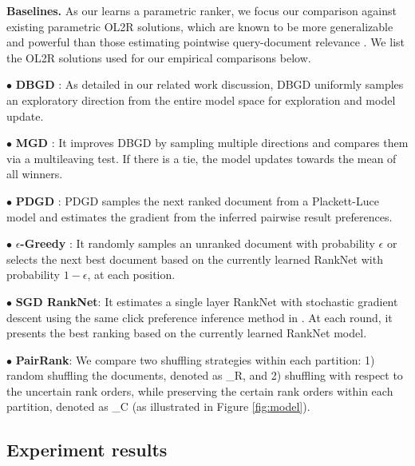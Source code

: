\noindent\textbf{Baselines.} As our \model{} learns a parametric ranker, we focus our comparison against existing parametric OL2R solutions, which are known to be more generalizable and powerful than those estimating pointwise query-document relevance \cite{radlinski2008learning,kveton2015cascading,zoghi2017online,lattimore2018toprank}. We list the OL2R solutions used for our empirical comparisons below.

\noindent $\bullet$ \textbf{DBGD} \cite{yue2009interactively}: As detailed in our related work discussion, DBGD uniformly samples an exploratory direction from the entire model space for exploration and model update.

\noindent $\bullet$ \textbf{MGD} \cite{schuth2016multileave}: It improves DBGD by sampling multiple directions and compares them via a multileaving test. If there is a tie, the model updates towards the mean of all winners.

\noindent $\bullet$  \textbf{PDGD} \cite{oosterhuis2018differentiable}: 
PDGD samples the next ranked document from a Plackett-Luce model and estimates the gradient from the inferred pairwise result preferences.

\noindent $\bullet$  \textbf{$\epsilon$-Greedy} \cite{hofmann2013balancing}: It randomly samples an unranked document with probability $\epsilon$ or selects the next best document based on the currently learned RankNet with probability $1 - \epsilon$, at each position.

\noindent $\bullet$ \textbf{SGD RankNet}: It estimates a single layer RankNet with stochastic gradient descent using the same click preference inference method in \model{}. At each round, it presents the best ranking based on the currently learned RankNet model.

\noindent $\bullet$ \textbf{PairRank}: We compare two shuffling strategies within each partition: 1) random shuffling the documents, denoted as \model{}\_R, and 2) shuffling with respect to the uncertain rank orders, while preserving the certain rank orders within each partition, denoted as \model{}\_C (as illustrated in Figure \ref{fig:model}).

\subsection{Experiment results}

